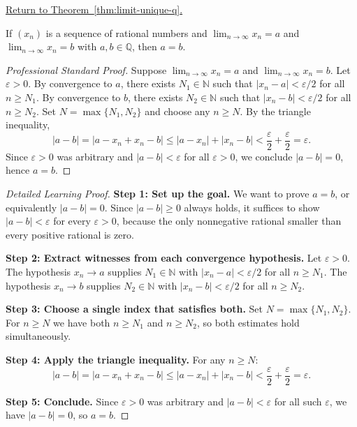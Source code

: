
\newpage
{}
\label{prf:limit-unique-q}

\begin{remark*}[Return]
\hyperref[thm:limit-unique-q]{Return to Theorem~\ref*{thm:limit-unique-q}.}
\end{remark*}

\begin{theorem*}
If $(x_n)$ is a sequence of rational numbers and
$\lim_{n\to\infty} x_n = a$ and $\lim_{n\to\infty} x_n = b$
with $a,b \in \mathbb{Q}$, then $a = b$.
\end{theorem*}

\begin{proof}[Professional Standard Proof]
\LRAProofBodyStart
Suppose $\lim_{n\to\infty} x_n = a$ and $\lim_{n\to\infty} x_n = b$.
Let $\varepsilon > 0$.
By convergence to $a$, there exists $N_1 \in \mathbb{N}$ such that
$|x_n - a| < \varepsilon/2$ for all $n \geq N_1$.
By convergence to $b$, there exists $N_2 \in \mathbb{N}$ such that
$|x_n - b| < \varepsilon/2$ for all $n \geq N_2$.
Set $N = \max\{N_1, N_2\}$ and choose any $n \geq N$.  By the triangle inequality,
\[
|a - b|
= |a - x_n + x_n - b|
\leq |a - x_n| + |x_n - b|
< \frac{\varepsilon}{2} + \frac{\varepsilon}{2}
= \varepsilon.
\]
Since $\varepsilon > 0$ was arbitrary and $|a - b| < \varepsilon$ for all
$\varepsilon > 0$, we conclude $|a - b| = 0$, hence $a = b$.
\end{proof}

\begin{proof}[Detailed Learning Proof]
\LRAProofBodyStart
\textbf{Step 1: Set up the goal.}
We want to prove $a = b$, or equivalently $|a - b| = 0$.
Since $|a - b| \geq 0$ always holds, it suffices to show $|a - b| < \varepsilon$
for every $\varepsilon > 0$, because the only nonnegative rational smaller
than every positive rational is zero.

\textbf{Step 2: Extract witnesses from each convergence hypothesis.}
Let $\varepsilon > 0$.  The hypothesis $x_n \to a$ supplies $N_1 \in \mathbb{N}$
with $|x_n - a| < \varepsilon/2$ for all $n \geq N_1$.
The hypothesis $x_n \to b$ supplies $N_2 \in \mathbb{N}$
with $|x_n - b| < \varepsilon/2$ for all $n \geq N_2$.

\textbf{Step 3: Choose a single index that satisfies both.}
Set $N = \max\{N_1, N_2\}$.  For $n \geq N$ we have both $n \geq N_1$
and $n \geq N_2$, so both estimates hold simultaneously.

\textbf{Step 4: Apply the triangle inequality.}
For any $n \geq N$:
\[
|a - b|
= |a - x_n + x_n - b|
\leq |a - x_n| + |x_n - b|
< \frac{\varepsilon}{2} + \frac{\varepsilon}{2}
= \varepsilon.
\]

\textbf{Step 5: Conclude.}
Since $\varepsilon > 0$ was arbitrary and $|a - b| < \varepsilon$ for
all such $\varepsilon$, we have $|a - b| = 0$, so $a = b$.
\end{proof}

